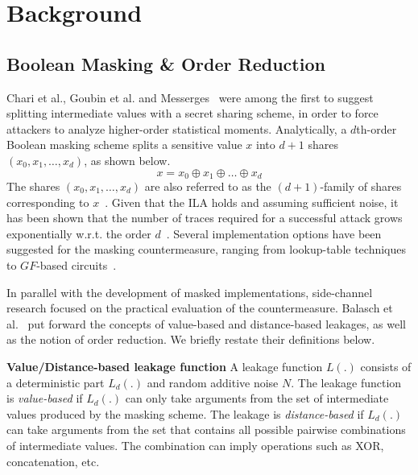 \section{Background} \label{sec:background}
\subsection{Boolean Masking \& Order Reduction}
Chari et al., Goubin et al. and Messerges~\cite{DBLP:conf/crypto/ChariJRR99,DBLP:conf/ches/GoubinP99,DBLP:conf/fse/Messerges00} were among the first to suggest splitting intermediate
values with a secret sharing scheme, in order to force attackers to analyze higher-order statistical moments. Analytically, a $d$th-order Boolean masking scheme splits a sensitive value $x$ into $d+1$ shares $(x_0, x_1, \dots, x_d)$, as shown below.
\begin{equation}
x = x_0 \oplus  x_1 \oplus \dots \oplus x_d
\end{equation}
The shares $(x_0, x_1, \dots, x_d)$ are also referred to as the $(d+1)$-family of shares corresponding to $x$~\cite{DBLP:conf/ches/RivainP10}. Given that the ILA holds and assuming sufficient noise, it has been shown that the number of traces required for a successful attack grows exponentially w.r.t. the order $d$~\cite{DBLP:conf/crypto/ChariJRR99,DBLP:conf/eurocrypt/ProuffR13}. Several implementation options have been suggested for the masking countermeasure, ranging from lookup-table techniques~\cite{DBLP:conf/eurocrypt/Coron14,DBLP:conf/ctrsa/WangVGX15} to $GF$-based circuits~\cite{DBLP:conf/crypto/IshaiSW03,DBLP:journals/iacr/CanrightB09,DBLP:conf/ches/RivainP10,cryptoeprint:2016:264}.

In parallel with the development of masked implementations, side-channel research focused on the practical evaluation of the countermeasure. Balasch et al.~\cite{DBLP:conf/cardis/BalaschGGRS14} put forward the concepts of value-based and distance-based leakages, as well as the notion of order reduction. We briefly restate their definitions below.

\vspace{0.15cm}
\noindent\textbf{Value/Distance-based leakage function} A leakage function $L(.)$ consists of a deterministic part $L_d(.)$ and random additive noise $N$. The leakage function is \emph{value-based} if $L_d(.)$ can only take arguments from the set of intermediate values produced by the masking scheme. The leakage is \emph{distance-based} if $L_d(.)$ can  take arguments from the set that contains all possible pairwise combinations of intermediate values. The combination can imply operations such as XOR, concatenation, etc.

